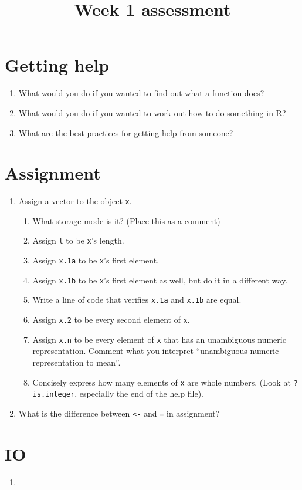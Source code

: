 \documentclass{article}\usepackage[]{graphicx}\usepackage[]{color}
\title{Week 1 assessment}
\begin{document}
\maketitle
\section{Getting help}


\begin{enumerate}
\item What would you do if you wanted to find out what a function does?
\item What would you do if you wanted to work out how to do something in R?
\item What are the best practices for getting help from someone?
\end{enumerate}

\section{Assignment}
\begin{enumerate}
\item Assign a vector to the object \texttt{x}. 
\begin{enumerate}
\item What storage mode is it? (Place this as a comment)
\item Assign \texttt{l} to be \texttt{x}'s length.
\item Assign \texttt{x.1a} to be \texttt{x}'s first element. 
\item Assign \texttt{x.1b} to be \texttt{x}'s first element as well, but do it in a different way.
\item Write a line of code that verifies \texttt{x.1a} and \texttt{x.1b} are equal.
\item Assign \texttt{x.2} to be every second element of \texttt{x}.
\item Assign \texttt{x.n} to be every element of \texttt{x} that has an unambiguous numeric representation. Comment what you interpret ``unambiguous numeric representation to mean''.
\item Concisely express how many elements of \texttt{x} are whole numbers. (Look at \texttt{?is.integer}, especially the end of the help file).
\end{enumerate}
\item What is the difference between \verb"<-" and \verb"=" in assignment?
\end{enumerate}

\section{IO}
\begin{enumerate}
\item 
\end{enumerate}
\end{document}
